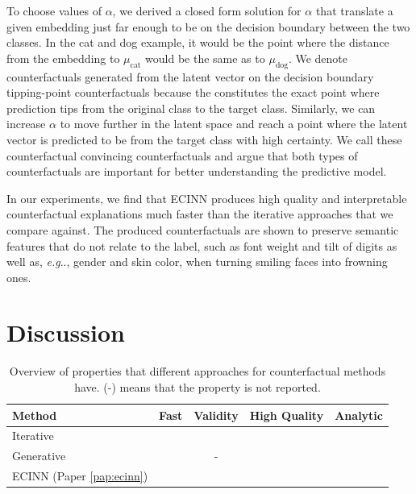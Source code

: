 \documentclass[11pt,a4paper,twoside,openright,final]{memoir}
\makeatletter
\newcommand{\cmark}{\ding{51}}%
\newcommand{\xmark}{\ding{55}}%
\newcommand{\greencheck}{\textcolor{green}{\cmark}}
\newcommand{\redcross}{\textcolor{red}{\xmark}}
\DeclareRobustCommand\onedot{\futurelet\@let@token\@onedot}
\def\@onedot{\ifx\@let@token.\else.\null\fi\xspace}
\def\eg{\emph{e.g}\onedot} \def\Eg{\emph{E.g}\onedot}
\newcommand*{\paperref}[1]{Paper \hyperref[#1]{\ref{#1}}}
\makeatother
\begin{document}
To choose values of $\alpha$, we derived a closed form solution for $\alpha$ that translate a given embedding just far enough to be on the decision boundary between the two classes.
In the cat and dog example, it would be the point where the distance from the embedding to $\mu_{\text{cat}}$ would be the same as to $\mu_{\text{dog}}$. 
We denote counterfactuals generated from the latent vector on the decision boundary tipping-point counterfactuals because the constitutes the exact point where prediction tips from the original class to the target class.
Similarly, we can increase $\alpha$ to move further in the latent space and reach a point where the latent vector is predicted to be from the target class with high certainty.
We call these counterfactual convincing counterfactuals and argue that both types of counterfactuals are important for better understanding the predictive model.

In our experiments, we find that ECINN produces high quality and interpretable counterfactual explanations much faster than the iterative approaches that we compare against. 
The produced counterfactuals are shown to preserve semantic features that do not relate to the label, such as font weight and tilt of digits as well as, \eg, gender and skin color, when turning smiling faces into frowning ones.


\section{Discussion} 

\begin{table}[b]
    \centering
    \begin{tabular}{lcccc}
    \toprule
        \textbf{Method}                                                 & \textbf{Fast}    & \textbf{Validity} & \textbf{High Quality}   & \textbf{Analytic}         \\
    \midrule                                                              
        Iterative \cite{Wachter2017, Dhurandhar2018, VanLooveren2019}   & \redcross        & \redcross         &  \redcross             & \redcross                 \\
        Generative \cite{Joshi2018, Rodriguez2021, Singla2019, flowcounterfactuals}  & \greencheck      & -                 &  \greencheck           & \redcross                 \\
        ECINN (\paperref{pap:ecinn})                                    & \greencheck      & \greencheck       &  \greencheck           & \greencheck               \\
    \bottomrule
    \end{tabular}
    \caption{Overview of properties that different approaches for counterfactual methods have. (-) means that the property is not reported.}
    \label{tab:cf-method-comparison}
\end{table}
\end{document}

